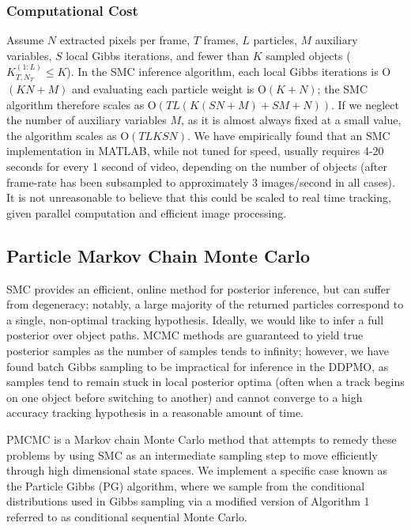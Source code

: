 \documentclass{article}
\begin{document}
\subsubsection{Computational Cost}
Assume $N$ extracted pixels per frame, $T$ frames, $L$ particles, $M$ auxiliary variables, $S$ local Gibbs iterations, and fewer than $K$ sampled objects ($K_{T,N_T}^{(1:L)} \leq K$). In the SMC inference algorithm, each local Gibbs iterations is O$(KN+M)$ and evaluating each particle weight is O$(K+N)$; the SMC algorithm therefore scales as 
O$(TL(K(SN+M)+SM+N))$. If we neglect the number of auxiliary variables $M$, as it is almost always fixed at a small value, the algorithm scales as O$(TLKSN)$.
We have empirically found that an SMC implementation in MATLAB, while not tuned for speed, usually requires 4-20 seconds for every 1 second of video, depending on the number of objects (after frame-rate has been subsampled to approximately 3 images/second in all cases). It is not unreasonable to believe that this could be scaled to real time tracking, given parallel computation  and efficient image processing.

\subsection{Particle Markov Chain Monte Carlo}
SMC provides an efficient, online method for posterior inference, but can suffer from degeneracy; notably, a large majority of the returned particles correspond to a single, non-optimal tracking hypothesis. Ideally, we would like to infer a full posterior over object paths. MCMC methods are guaranteed to yield true posterior samples as the number of samples tends to infinity; however, we have found batch Gibbs sampling to be impractical for inference in the DDPMO, as samples tend to remain stuck in local posterior optima (often when a track begins on one object before switching to another) and cannot converge to a high accuracy tracking hypothesis in a reasonable amount of time.

PMCMC \cite{andrieu2010particle} is a Markov chain Monte Carlo method that attempts to remedy these problems by using SMC as an intermediate sampling step to move efficiently through high dimensional state spaces. We implement a specific case known as the Particle Gibbs (PG) algorithm, where we sample from the conditional distributions used in Gibbs sampling via a modified version of Algorithm 1 referred to as conditional sequential Monte Carlo.
\end{document}
